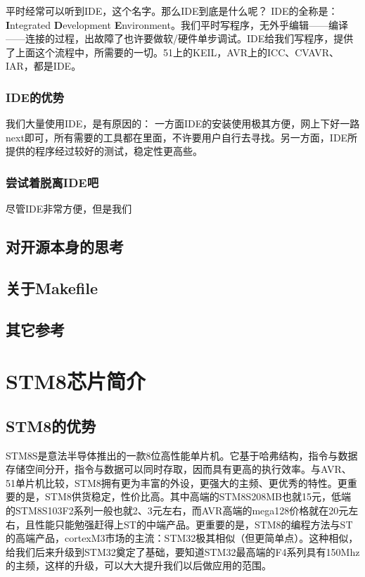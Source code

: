 \documentclass[a4paper]{book}
\newcommand{\chap}[1]{\newpage\thispagestyle{empty}\chapter{#1}\label{chap:\thechapter}}
\begin{document}
平时经常可以听到IDE，这个名字。那么IDE到底是什么呢？ IDE的全称是： \textbf{I}ntegrated \textbf{D}evelopment \textbf{E}nvironment。我们平时写程序，无外乎编辑------编译------连接的过程，出故障了也许要做软/硬件单步调试。IDE给我们写程序，提供了上面这个流程中，所需要的一切。51上的KEIL，AVR上的ICC、CVAVR、IAR，都是IDE。

\subsection{IDE的优势}

我们大量使用IDE，是有原因的： 一方面IDE的安装使用极其方便，网上下好一路next即可，所有需要的工具都在里面，不许要用户自行去寻找。另一方面，IDE所提供的程序经过较好的测试，稳定性更高些。

\subsection{尝试着脱离IDE吧}

尽管IDE非常方便，但是我们

\section{对开源本身的思考}

\section{关于Makefile}

\section{其它参考}

\chap{STM8芯片简介}

\section{STM8的优势}

STM8S是意法半导体推出的一款8位高性能单片机。它基于哈弗结构，指令与数据存储空间分开，指令与数据可以同时存取，因而具有更高的执行效率。与AVR、51单片机比较，STM8拥有更为丰富的外设，更强大的主频、更优秀的特性。更重要的是，STM8供货稳定，性价比高。其中高端的STM8S208MB也就15元，低端的STM8S103F2系列一般也就2、3元左右，而AVR高端的mega128价格就在20元左右，且性能只能勉强赶得上ST的中端产品。更重要的是，STM8的编程方法与ST的高端产品，cortexM3市场的主流：STM32极其相似（但更简单点）。这种相似，给我们后来升级到STM32奠定了基础，要知道STM32最高端的F4系列具有150Mhz的主频，这样的升级，可以大大提升我们以后做应用的范围。
\end{document}
